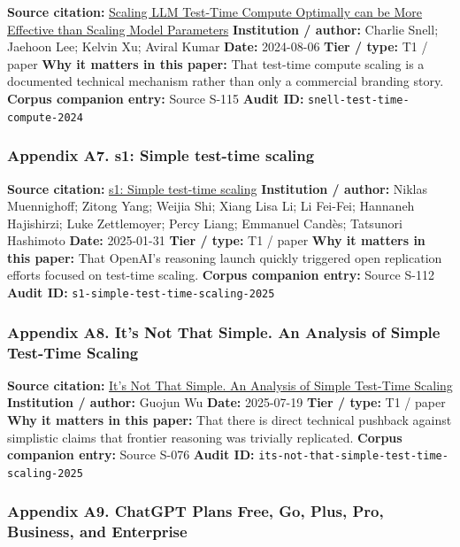 \documentclass[
  american,
  11pt,
  letterpaper,
]{article}
\begin{document}
\textbf{Source citation:}
\href{https://arxiv.org/abs/2408.03314}{Scaling LLM Test-Time Compute
Optimally can be More Effective than Scaling Model Parameters}
\textbf{Institution / author:} Charlie Snell; Jaehoon Lee; Kelvin Xu;
Aviral Kumar \textbf{Date:} 2024-08-06 \textbf{Tier / type:} T1 / paper
\textbf{Why it matters in this paper:} That test-time compute scaling is
a documented technical mechanism rather than only a commercial branding
story. \textbf{Corpus companion entry:} Source S-115 \textbf{Audit ID:}
\texttt{snell-test-time-compute-2024}

\subsubsection{Appendix A7. s1: Simple test-time
scaling}\label{ch-06-appendix-a7-s1-simple-test-time-scaling}

\textbf{Source citation:} \href{https://arxiv.org/abs/2501.19393}{s1:
Simple test-time scaling} \textbf{Institution / author:} Niklas
Muennighoff; Zitong Yang; Weijia Shi; Xiang Lisa Li; Li Fei-Fei;
Hannaneh Hajishirzi; Luke Zettlemoyer; Percy Liang; Emmanuel Candès;
Tatsunori Hashimoto \textbf{Date:} 2025-01-31 \textbf{Tier / type:} T1 /
paper \textbf{Why it matters in this paper:} That OpenAI's reasoning
launch quickly triggered open replication efforts focused on test-time
scaling. \textbf{Corpus companion entry:} Source S-112 \textbf{Audit
ID:} \texttt{s1-simple-test-time-scaling-2025}

\subsubsection{Appendix A8. It's Not That Simple. An Analysis of Simple
Test-Time
Scaling}\label{ch-06-appendix-a8-it-s-not-that-simple-an-analysis-of-simple-test-time-scaling}

\textbf{Source citation:} \href{https://arxiv.org/abs/2507.14419}{It's
Not That Simple. An Analysis of Simple Test-Time Scaling}
\textbf{Institution / author:} Guojun Wu \textbf{Date:} 2025-07-19
\textbf{Tier / type:} T1 / paper \textbf{Why it matters in this paper:}
That there is direct technical pushback against simplistic claims that
frontier reasoning was trivially replicated. \textbf{Corpus companion
entry:} Source S-076 \textbf{Audit ID:}
\texttt{its-not-that-simple-test-time-scaling-2025}

\subsubsection{Appendix A9. ChatGPT Plans \textbar{} Free, Go, Plus,
Pro, Business, and
Enterprise}\label{ch-06-appendix-a9-chatgpt-plans-free-go-plus-pro-business-and-enterprise}
\end{document}
